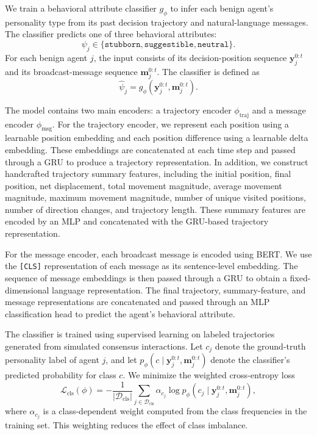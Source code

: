 \documentclass{article}
\theoremstyle{plain}
\theoremstyle{definition}
\theoremstyle{remark}
\begin{document}
We train a behavioral attribute classifier \(g_\phi\) to infer each benign agent's personality type from its past decision trajectory and natural-language messages. The classifier predicts one of three behavioral attributes:
\[
\psi_j \in \{\texttt{stubborn}, \texttt{suggestible}, \texttt{neutral}\}.
\]
For each benign agent \(j\), the input consists of its decision-position sequence \(\mathbf{y}_j^{0:t}\) and its broadcast-message sequence \(\mathbf{m}_j^{0:t}\). The classifier is defined as
\[
\hat{\psi}_j
=
g_\phi
\left(
\mathbf{y}_j^{0:t},
\mathbf{m}_j^{0:t}
\right).
\]

The model contains two main encoders: a trajectory encoder \(\phi_{\mathrm{traj}}\) and a message encoder \(\phi_{\mathrm{msg}}\). For the trajectory encoder, we represent each position using a learnable position embedding and each position difference using a learnable delta embedding. These embeddings are concatenated at each time step and passed through a GRU to produce a trajectory representation. In addition, we construct handcrafted trajectory summary features, including the initial position, final position, net displacement, total movement magnitude, average movement magnitude, maximum movement magnitude, number of unique visited positions, number of direction changes, and trajectory length. These summary features are encoded by an MLP and concatenated with the GRU-based trajectory representation.

For the message encoder, each broadcast message is encoded using BERT. We use the \texttt{[CLS]} representation of each message as its sentence-level embedding. The sequence of message embeddings is then passed through a GRU to obtain a fixed-dimensional language representation. The final trajectory, summary-feature, and message representations are concatenated and passed through an MLP classification head to predict the agent's behavioral attribute.

The classifier is trained using supervised learning on labeled trajectories generated from simulated consensus interactions. Let \(c_j\) denote the ground-truth personality label of agent \(j\), and let \(p_\phi(c \mid \mathbf{y}_j^{0:t}, \mathbf{m}_j^{0:t})\) denote the classifier's predicted probability for class \(c\). We minimize the weighted cross-entropy loss
\[
\mathcal{L}_{\mathrm{cls}}(\phi)
=
-
\frac{1}{|\mathcal{D}_{\mathrm{cls}}|}
\sum_{j \in \mathcal{D}_{\mathrm{cls}}}
\alpha_{c_j}
\log
p_\phi
\left(
c_j
\mid
\mathbf{y}_j^{0:t},
\mathbf{m}_j^{0:t}
\right),
\]
where \(\alpha_{c_j}\) is a class-dependent weight computed from the class frequencies in the training set. This weighting reduces the effect of class imbalance.
\end{document}
